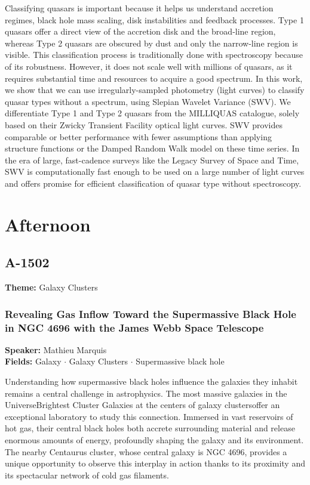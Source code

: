 Classifying quasars is important because it helps us understand accretion regimes, black hole mass scaling, disk instabilities and feedback processes. Type 1 quasars offer a direct view of the accretion disk and the broad-line region, whereas Type 2 quasars are obscured by dust and only the narrow-line region is visible. This classification process is traditionally done with spectroscopy because of its robustness. However, it does not scale well with millions of quasars, as it requires substantial time and resources to acquire a good spectrum. In this work, we show that we can use irregularly-sampled photometry (light curves) to classify quasar types without a spectrum, using Slepian Wavelet Variance (SWV). We differentiate Type 1 and Type 2 quasars from the MILLIQUAS catalogue, solely based on their Zwicky Transient Facility optical light curves. SWV provides comparable or better performance with fewer assumptions than applying structure functions or the Damped Random Walk model on these time series. In the era of large, fast-cadence surveys like the Legacy Survey of Space and Time, SWV is computationally fast enough to be used on a large number of light curves and offers promise for efficient classification of quasar type without spectroscopy.


\section*{Afternoon}

\subsection*{A-1502}
\textbf{Theme:} Galaxy Clusters

\hypertarget{abstract-talk-273}{}\label{abstract-page-talk-273}
\subsubsection*{Revealing Gas Inflow Toward the Supermassive Black Hole in NGC 4696 with the James Webb Space Telescope}
\textbf{Speaker:} Mathieu Marquis\\
\textbf{Fields:} Galaxy $\cdot$ Galaxy Clusters $\cdot$ Supermassive black hole

Understanding how supermassive black holes influence the galaxies they inhabit remains a central challenge in astrophysics. The most massive galaxies in the UniverseBrightest Cluster Galaxies at the centers of galaxy clustersoffer an exceptional laboratory to study this connection. Immersed in vast reservoirs of hot gas, their central black holes both accrete surrounding material and release enormous amounts of energy, profoundly shaping the galaxy and its environment. The nearby Centaurus cluster, whose central galaxy is NGC 4696, provides a unique opportunity to observe this interplay in action thanks to its proximity and its spectacular network of cold gas filaments.

